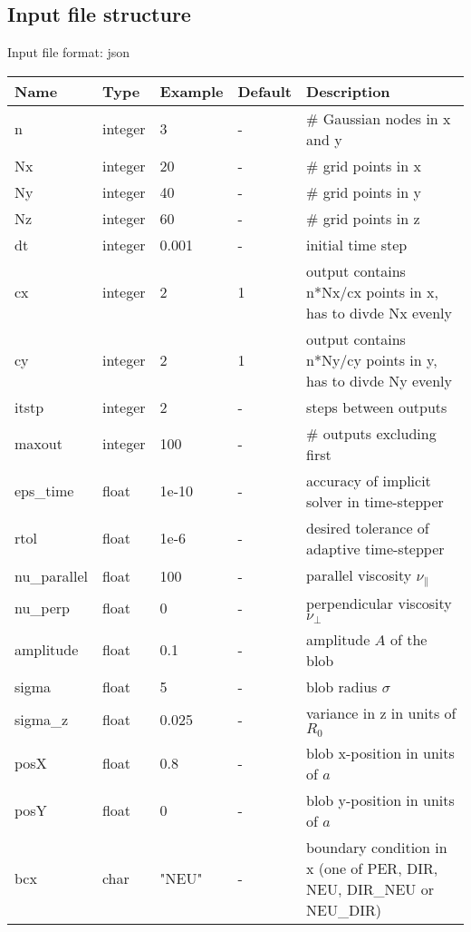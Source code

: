 \subsection{Input file structure}
Input file format: json

\begin{longtable}{llll>{\RaggedRight}p{7cm}}
\toprule
\rowcolor{gray!50}\textbf{Name} &  \textbf{Type} & \textbf{Example} & \textbf{Default} & \textbf{Description}  \\ \midrule
  n      & integer & 3 & - &\# Gaussian nodes in x and y \\
  Nx     & integer &20& - &\# grid points in x \\
  Ny     & integer &40& - &\# grid points in y \\
  Nz     & integer &60& - &\# grid points in z \\
  dt     & integer &0.001& - &initial time step\\
  cx & integer & 2 & 1 & output contains n*Nx/cx points in x,
    has to divde Nx evenly\\
  cy & integer & 2 & 1 & output contains n*Ny/cy points in y,
    has to divde Ny evenly\\
  itstp  & integer &2  & - &   steps between outputs \\
  maxout & integer &100& - &      \# outputs excluding first \\
  eps\_time  & float &1e-10   & - & accuracy of implicit solver in time-stepper \\
  rtol  & float  & 1e-6  & - & desired tolerance of adaptive time-stepper \\
  nu\_parallel    & float &100   & - & parallel viscosity $\nu_\parallel$ \\
  nu\_perp    & float &0   & - & perpendicular viscosity $\nu_\perp$ \\
  amplitude  & float &0.1    & - & amplitude $A$ of the blob \\
  sigma      & float &5     & - & blob radius $\sigma$ \\
  sigma\_z   & float &0.025  & - & variance in z in units of $R_0$ \\
  posX       & float &0.8    & - & blob x-position in units of $a$\\
  posY       & float &0    & - & blob y-position in units of $a$\\
  bcx   & char & "NEU"      & - & boundary condition in x (one of PER, DIR, NEU, DIR\_NEU or NEU\_DIR) \\

\end{longtable}
